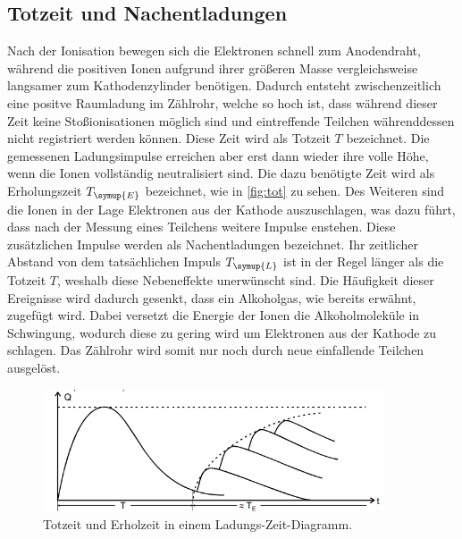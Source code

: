 \subsection{Totzeit und Nachentladungen}
Nach der Ionisation bewegen sich die Elektronen schnell zum Anodendraht, während die positiven Ionen aufgrund ihrer größeren Masse
vergleichsweise langsamer zum Kathodenzylinder benötigen. Dadurch entsteht zwischenzeitlich eine positve Raumladung im Zählrohr, welche
so hoch ist, dass während dieser Zeit keine Stoßionisationen möglich sind und eintreffende Teilchen währenddessen nicht registriert werden können.
Diese Zeit wird als Totzeit $T$ bezeichnet. Die gemessenen Ladungsimpulse erreichen aber erst dann wieder ihre volle Höhe, wenn die Ionen
vollständig neutralisiert sind. Die dazu benötigte Zeit wird als Erholungszeit $T_{\symup{E}}$ bezeichnet, wie in \autoref{fig:tot} zu
sehen. Des Weiteren sind die Ionen in der Lage Elektronen aus der Kathode auszuschlagen, was dazu führt, dass nach der Messung eines Teilchens
weitere Impulse enstehen. Diese zusätzlichen Impulse werden als Nachentladungen bezeichnet. Ihr zeitlicher Abstand von dem tatsächlichen Impuls
$T_{\symup{L}}$ ist in der Regel länger als die Totzeit $T$, weshalb diese Nebeneffekte unerwünscht sind. Die Häufigkeit dieser Ereignisse
wird dadurch gesenkt, dass ein Alkoholgas, wie bereits erwähnt, zugefügt wird. Dabei versetzt die Energie der Ionen die Alkoholmoleküle in
Schwingung, wodurch diese zu gering wird um Elektronen aus der Kathode zu schlagen. Das Zählrohr wird somit nur noch durch neue einfallende
Teilchen ausgelöst.
\begin{figure}
    \centering
    \includegraphics[width=0.9\textwidth]{content/totzeit.png}
    \caption{Totzeit und Erholzeit in einem Ladungs-Zeit-Diagramm.}
    \label{fig:tot}
\end{figure}
